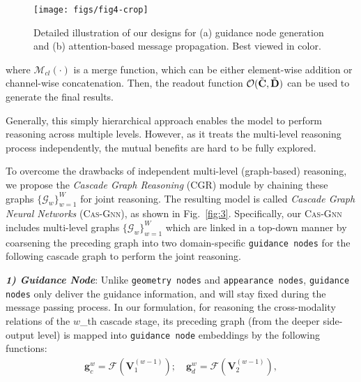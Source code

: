 \documentclass[runningheads]{llncs}
\begin{document}
\begin{figure}[pt]
	\begin{center}
		\texttt{[image: figs/fig4-crop]}
	\end{center}
	\caption{Detailed illustration of our designs for (a) guidance node generation and (b) attention-based message propagation. Best viewed in color. }
	\label{fig:4}
\end{figure}

\noindent where $\mathcal{M}_{cl}(\cdot)$ is a merge function, which can be either element-wise addition or channel-wise concatenation.  Then, the readout function $\mathcal{O} (\Tilde{\mathbf C}, \Tilde{\mathbf D})$ can be used to generate the final results. 

Generally, this simply hierarchical approach enables the model to perform reasoning across multiple levels. However, as it treats the multi-level reasoning process independently, the mutual benefits are hard to be fully explored. 

To overcome the drawbacks of independent multi-level (graph-based) reasoning, we propose the {\em Cascade Graph Reasoning} (CGR) module by chaining these graphs $\{\mathcal {G}_w\}_{w=1}^W$ for joint reasoning. The resulting model is called {\em Cascade Graph Neural Networks} ({\scshape{Cas-Gnn}}), as shown in Fig.~\ref{fig:3}. Specifically, our {\scshape{Cas-Gnn}} includes multi-level graphs $\{\mathcal{G}_w\}_{w=1}^W$ which are linked in a top-down manner by coarsening the preceding graph into two domain-specific {\tt guidance nodes} for the following cascade graph to perform the joint reasoning.

\noindent \emph{\textbf{\footnotesize 1) Guidance Node}}: Unlike {\tt geometry nodes} and  {\tt appearance nodes}, {\tt guidance nodes} only deliver the guidance information, and will stay fixed during the message passing process. In our formulation, for reasoning the cross-modality relations of the $w$\_th cascade stage, its preceding graph (from the deeper side-output level) is mapped into {\tt guidance node} embeddings by the following functions:
\begin{equation}
\begin{aligned}
\mathbf g^{w}_{c} = \mathcal F(\mathbf V^{(w-1)}_1); \quad \mathbf g^{w}_{d} = \mathcal F(\mathbf V^{(w-1)}_2),  
\label{eq9}
\end{aligned}
\end{equation}
\end{document}
